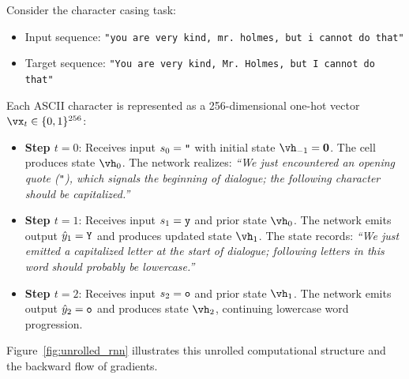 \documentclass[../../main.tex]{subfiles}
\begin{document}
Consider the character casing task:
\begin{itemize}
    \item Input sequence: \texttt{"you are very kind, mr. holmes, but i cannot do that"}
    \item Target sequence: \texttt{"You are very kind, Mr. Holmes, but I cannot do that"}
\end{itemize}
Each ASCII character is represented as a 256-dimensional one-hot vector $\vx_t \in \{0, 1\}^{256}$:
\begin{itemize}
    \item \textbf{Step $t=0$}: Receives input $s_0 = \text{\texttt{"}}$ with initial state $\vh_{-1} = \mathbf{0}$. The cell produces state $\vh_0$. The network realizes: \textit{``We just encountered an opening quote (\texttt{"}), which signals the beginning of dialogue; the following character should be capitalized.''}
    \item \textbf{Step $t=1$}: Receives input $s_1 = \text{\texttt{y}}$ and prior state $\vh_0$. The network emits output $\hat{y}_1 = \text{\texttt{Y}}$ and produces updated state $\vh_1$. The state records: \textit{``We just emitted a capitalized letter at the start of dialogue; following letters in this word should probably be lowercase.''}
    \item \textbf{Step $t=2$}: Receives input $s_2 = \text{\texttt{o}}$ and prior state $\vh_1$. The network emits output $\hat{y}_2 = \text{\texttt{o}}$ and produces state $\vh_2$, continuing lowercase word progression.
\end{itemize}

Figure~\ref{fig:unrolled_rnn} illustrates this unrolled computational structure and the backward flow of gradients.
\end{document}
